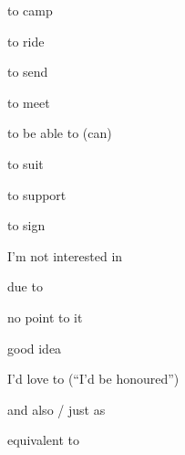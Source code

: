 \documentclass[avery5371,grid,frame]{flashcards}
\begin{document}
\begin{flashcard}{\LARGE to camp}
\LARGE {}
\end{flashcard}
\begin{flashcard}{\LARGE to ride}
\LARGE {}
\end{flashcard}
\begin{flashcard}{\LARGE to send}
\LARGE {}
\end{flashcard}
\begin{flashcard}{\LARGE to meet}
\LARGE {}
\end{flashcard}
\begin{flashcard}{\LARGE to be able to (can)}
\LARGE {}
\end{flashcard}
\begin{flashcard}{\LARGE to suit}
\LARGE {}
\end{flashcard}
\begin{flashcard}{\LARGE to support}
\LARGE {}
\end{flashcard}
\begin{flashcard}{\LARGE to sign}
\LARGE {}
\end{flashcard}
\begin{flashcard}{\LARGE I'm not interested in}
\LARGE {}
\end{flashcard}
\begin{flashcard}{\LARGE due to}
\LARGE {}
\end{flashcard}
\begin{flashcard}{\LARGE no point to it}
\LARGE {}
\end{flashcard}
\begin{flashcard}{\LARGE good idea}
\LARGE {}
\end{flashcard}
\begin{flashcard}{\LARGE I'd love to (``I'd be honoured'')}
\LARGE {}
\end{flashcard}
\begin{flashcard}{\LARGE and also / just as}
\LARGE {}
\end{flashcard}
\begin{flashcard}{\LARGE equivalent to}
\LARGE {}
\end{flashcard}
\end{document}
